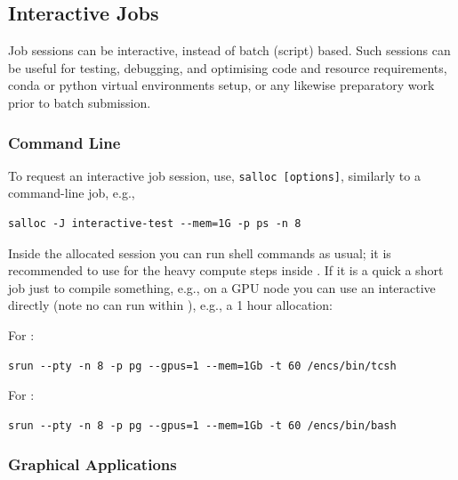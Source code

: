 \subsection{Interactive Jobs}
\label{sect:interactive-jobs}

Job sessions can be interactive, instead of batch (script) based. Such 
sessions can be useful for testing, debugging, and optimising code and resource 
requirements, conda or python virtual environments setup, or any likewise
preparatory work prior to batch submission.

\subsubsection{Command Line}

To request an interactive job 
session, use, \texttt{salloc [options]}, similarly to a 
 command-line job, e.g.,
%
\begin{verbatim}
salloc -J interactive-test --mem=1G -p ps -n 8
\end{verbatim}
%
%
Inside the allocated  session you can run shell
commands as usual; it is recommended to use  for
the heavy compute steps inside .
%
If it is a quick a short job just to compile something, e.g., on
a GPU node you can use an interactive  directly
(note no  can run within ), e.g., a 1 hour
allocation:

For :
\begin{verbatim}
srun --pty -n 8 -p pg --gpus=1 --mem=1Gb -t 60 /encs/bin/tcsh
\end{verbatim}

For :
\begin{verbatim}
srun --pty -n 8 -p pg --gpus=1 --mem=1Gb -t 60 /encs/bin/bash
\end{verbatim}

\subsubsection{Graphical Applications}

